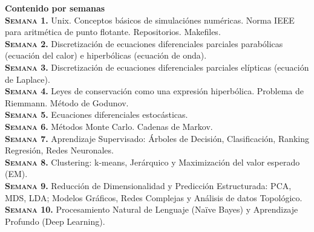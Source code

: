 \documentclass[letterpaper,10pt,onecolumn]{article}
\begin{document}
\noindent\textbf{\large {} \quad Contenido por
  semanas}\\[-0.2cm] 



\noindent\normalsize\textbf{\textsc{Semana 1.}} Unix. Conceptos b\'asicos de
simulaci\'ones num\'ericas. Norma IEEE para aritm\'etica de punto
flotante. Repositorios. Makefiles.
\\[-0.3cm]   

\noindent\textbf{\textsc{Semana 2.}} 
Discretizaci\'on de ecuaciones
diferenciales parciales parab\'olicas (ecuaci\'on del calor) e
hiperb\'olicas (ecuaci\'on de onda).   
\\[-0.3cm]  

\noindent\textbf{\textsc{Semana 3.}} 
Discretizaci\'on de ecuaciones
diferenciales parciales el\'ipticas (ecuaci\'on de Laplace).   
\\[-0.3cm]  

\noindent\textbf{\textsc{Semana 4.}} 
Leyes de conservaci\'on como una expresi\'on hiperb\'olica. Problema
de Riemmann. M\'etodo de Godunov.
\\[-0.3cm]  

\noindent\textbf{\textsc{Semana 5.}}
Ecuaciones diferenciales estoc\'asticas.
\\[-0.3cm] 

\noindent\textbf{\textsc{Semana 6.}} 
M\'etodos Monte Carlo. Cadenas de Markov. 
\\[-0.3cm]  

\noindent\textbf{\textsc{Semana 7.}} 
Aprendizaje Supervisado: Árboles de Decisión, Clasificación, Ranking
Regresión, Redes Neuronales. 
\\[-0.3cm]  

\noindent\textbf{\textsc{Semana 8.}} 
Clustering: k-means, Jerárquico y Maximización del valor esperado (EM).
\\[-0.3cm] 

\noindent\textbf{\textsc{Semana 9.}} 
Reducción de Dimensionalidad y Predicción Estructurada: PCA, MDS, LDA;
Modelos Gráficos, Redes Complejas y Análisis de datos Topológico.  
\\[-0.3cm] 

\noindent\textbf{\textsc{Semana 10.}}  
Procesamiento Natural de Lenguaje (Naïve Bayes) y Aprendizaje Profundo
(Deep Learning). 
\\[-0.3cm] 
\end{document}

